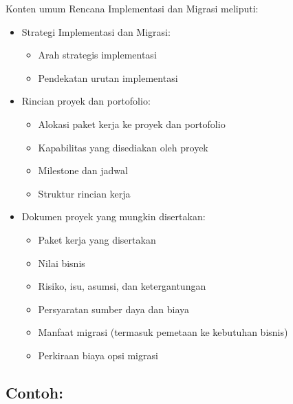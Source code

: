 Konten umum Rencana Implementasi dan Migrasi meliputi:
\begin{itemize}
	\item Strategi Implementasi dan Migrasi:
	\begin{itemize}
		\item Arah strategis implementasi
		\item Pendekatan urutan implementasi
	\end{itemize}
	\item Rincian proyek dan portofolio:
	\begin{itemize}
		\item Alokasi paket kerja ke proyek dan portofolio
		\item Kapabilitas yang disediakan oleh proyek
		\item Milestone dan jadwal
		\item Struktur rincian kerja
	\end{itemize}
	\item Dokumen proyek yang mungkin disertakan:
	\begin{itemize}
		\item Paket kerja yang disertakan
		\item Nilai bisnis
		\item Risiko, isu, asumsi, dan ketergantungan
		\item Persyaratan sumber daya dan biaya
		\item Manfaat migrasi (termasuk pemetaan ke kebutuhan bisnis)
		\item Perkiraan biaya opsi migrasi
	\end{itemize}
\end{itemize}

\subsection*{Contoh:}

